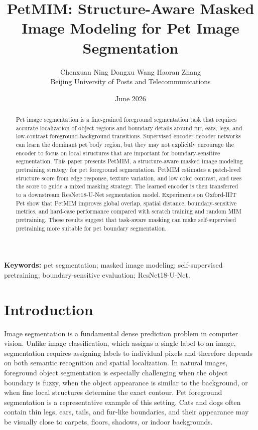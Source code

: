 \documentclass[11pt]{article}
\title{\textbf{PetMIM: Structure-Aware Masked Image Modeling for Pet Image Segmentation}}
\author{
Chenxuan Ning \quad Dongxu Wang \quad Haoran Zhang\\
Beijing University of Posts and Telecommunications
}
\date{June 2026}
\begin{document}
\maketitle

\begin{abstract}
\hspace{\parindent}Pet image segmentation is a fine-grained foreground segmentation task that requires accurate localization of object regions and boundary details around fur, ears, legs, and low-contrast foreground-background transitions. Supervised encoder-decoder networks can learn the dominant pet body region, but they may not explicitly encourage the encoder to focus on local structures that are important for boundary-sensitive segmentation. This paper presents PetMIM, a structure-aware masked image modeling pretraining strategy for pet foreground segmentation. PetMIM estimates a patch-level structure score from edge response, texture variation, and low color contrast, and uses the score to guide a mixed masking strategy. The learned encoder is then transferred to a downstream ResNet18-U-Net segmentation model. Experiments on Oxford-IIIT Pet show that PetMIM improves global overlap, spatial distance, boundary-sensitive metrics, and hard-case performance compared with scratch training and random MIM pretraining. These results suggest that task-aware masking can make self-supervised pretraining more suitable for pet boundary segmentation.
\end{abstract}

\textbf{Keywords:} pet segmentation; masked image modeling; self-supervised pretraining; boundary-sensitive evaluation; ResNet18-U-Net.

\section{Introduction}

Image segmentation is a fundamental dense prediction problem in computer vision. Unlike image classification, which assigns a single label to an image, segmentation requires assigning labels to individual pixels and therefore depends on both semantic recognition and spatial localization. In natural images, foreground object segmentation is especially challenging when the object boundary is fuzzy, when the object appearance is similar to the background, or when fine local structures determine the exact contour. Pet foreground segmentation is a representative example of this setting. Cats and dogs often contain thin legs, ears, tails, and fur-like boundaries, and their appearance may be visually close to carpets, floors, shadows, or indoor backgrounds.
\end{document}

